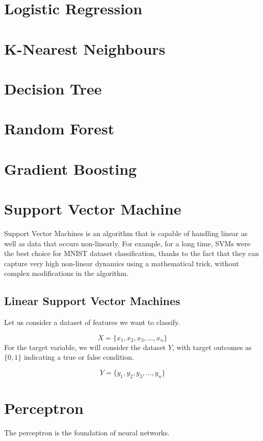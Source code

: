 \documentclass[12pt]{article}
\begin{document}
\newpage
\section{Logistic Regression}

\newpage
\section{K-Nearest Neighbours}

\newpage
\section{Decision Tree}

\newpage
\section{Random Forest}

\newpage
\section{Gradient Boosting}

\newpage
\section{Support Vector Machine}
Support Vector Machines is an algorithm that is capable of handling 
linear as well as data that occurs non-linearly. For example, for a long time, SVMs were the best
choice for MNIST dataset classification, thanks to the fact that they can capture very high
non-linear dynamics using a mathematical trick, without complex modifications in the
algorithm.

\subsection{Linear Support Vector Machines}
Let us consider a dataset of features we want to classify.

$$
X = \lbrace x_{1}, x_{2}, x_{3}, ... , x_{n} \rbrace 
$$
For the target variable, we will consider the dataset $Y$, with target outcomes as $\lbrace0,1\rbrace$ indicating a true or false condition.

$$
Y = \lbrace y_{1}, y_{2}, y_{3}, ... , y_{n} \rbrace 
$$

\newpage
\section{Perceptron}
The perceptron is the foundation of neural networks.
\end{document}
